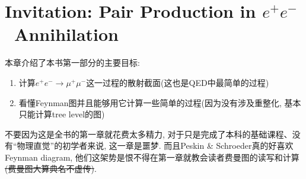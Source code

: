 \chapter{Invitation: Pair Production in \texorpdfstring{$e^+e^-$}\ \ Annihilation}

本章介绍了本书第一部分的主要目标:
\begin{enumerate}
  \item 计算$e^+e^-\rightarrow \mu^+\mu^-$这一过程的散射截面(这也是QED中最简单的过程)
  \item 看懂Feynman图并且能够用它计算一些简单的过程(因为没有涉及重整化, 基本只能计算tree level的图)
\end{enumerate}

不要因为这是全书的第一章就花费太多精力, 对于只是完成了本科的基础课程、没有“物理直觉”的初学者来说, 这一章是噩梦.
而且Peskin \& Schroeder真的好喜欢 Feynman diagram, 他们这架势是恨不得在第一章就教会读者费曼图的读写和计算\sout{(费曼图大算典名不虚传)}.
\pagestyle{fancy}